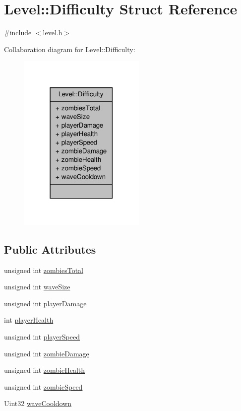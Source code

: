 \hypertarget{structLevel_1_1Difficulty}{\section{Level\-:\-:Difficulty Struct Reference}
\label{structLevel_1_1Difficulty}
}


{\ttfamily \#include $<$level.\-h$>$}



Collaboration diagram for Level\-:\-:Difficulty\-:\nopagebreak
\begin{figure}[H]
\begin{center}
\leavevmode
\includegraphics[width=174pt]{structLevel_1_1Difficulty__coll__graph}
\end{center}
\end{figure}
\subsection*{Public Attributes}
\begin{DoxyCompactItemize}
\item 
unsigned int \hyperlink{structLevel_1_1Difficulty_adde47502037079e2c1552140e1aecbe0}{zombies\-Total}
\item 
unsigned int \hyperlink{structLevel_1_1Difficulty_a8c66cad375ccda67a95f9430b3354488}{wave\-Size}
\item 
unsigned int \hyperlink{structLevel_1_1Difficulty_a79ae994f2fa39128956f639f858e0b02}{player\-Damage}
\item 
int \hyperlink{structLevel_1_1Difficulty_a888e1da805bb7ecfc97164e885ee6265}{player\-Health}
\item 
unsigned int \hyperlink{structLevel_1_1Difficulty_ae64bf4253a073ec5b496634112de2137}{player\-Speed}
\item 
unsigned int \hyperlink{structLevel_1_1Difficulty_a59adf3184823a740957e78f62d39c6df}{zombie\-Damage}
\item 
unsigned int \hyperlink{structLevel_1_1Difficulty_a3c4e883253dcd88fa5f221b2684d22ba}{zombie\-Health}
\item 
unsigned int \hyperlink{structLevel_1_1Difficulty_ad9dfcb0694df92389e64e5a9a2e7316e}{zombie\-Speed}
\item 
Uint32 \hyperlink{structLevel_1_1Difficulty_a13ffa97715443be3d015def5752325cb}{wave\-Cooldown}
\end{DoxyCompactItemize}


